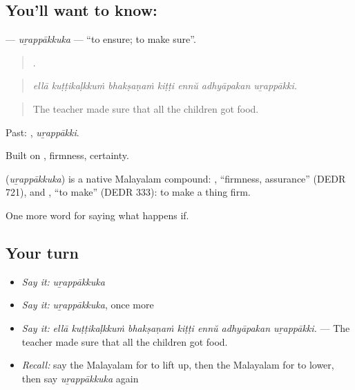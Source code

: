 \subsection*{You'll want to know: }
\textbf{} — \emph{uṟappākkuka} — \textquotedblleft{}to ensure; to make sure\textquotedblright{}.

\begin{quote}
      .
\end{quote}

\begin{quote}
\emph{ellā kuṭṭikaḷkkuṁ bhakṣaṇaṁ kiṭṭi ennŭ adhyāpakan uṟappākki.}
\end{quote}

\begin{quote}
The teacher made sure that all the children got food.
\end{quote}

Past: , \emph{uṟappākki}.

Built on , firmness, certainty.

\begin{cousinweb}
\textbf{} (\emph{uṟappākkuka}) is a native Malayalam compound: , \textquotedblleft{}firmness, assurance\textquotedblright{} (DEDR 721), and , \textquotedblleft{}to make\textquotedblright{} (DEDR 333): to make a thing firm.
\end{cousinweb}

\begin{grammarlens}[title={What you've built}]
One more word for saying what happens if.
\end{grammarlens}

\subsection*{Your turn}
\begin{itemize}
\raggedright
  \item \emph{Say it:} \emph{uṟappākkuka}
  \item \emph{Say it:} \emph{uṟappākkuka}, once more
  \item \emph{Say it:} \emph{ellā kuṭṭikaḷkkuṁ bhakṣaṇaṁ kiṭṭi ennŭ adhyāpakan uṟappākki.} — The teacher made sure that all the children got food.
  \item \emph{Recall:} say the Malayalam for to lift up, then the Malayalam for to lower, then say \emph{uṟappākkuka} again
\end{itemize}


